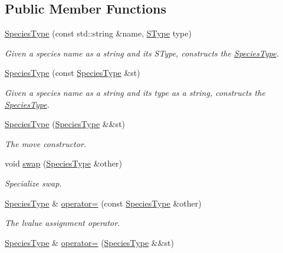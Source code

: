 \subsection*{Public Member Functions}
\begin{DoxyCompactItemize}
\item 
\hyperlink{classchem_1_1SpeciesType_aba027be970f9815e8c5b06e8e6b35d56}{Species\-Type} (const std\-::string \&name, \hyperlink{namespacechem_ad1edc1332f82ed64dd8a810596e781da}{S\-Type} type)
\begin{DoxyCompactList}\small\item\em Given a species name as a string and its S\-Type, constructs the \hyperlink{classchem_1_1SpeciesType}{Species\-Type}. \end{DoxyCompactList}\item 
\hyperlink{classchem_1_1SpeciesType_a265e6d109abe6c02301cb6c4fbd65f04}{Species\-Type} (const \hyperlink{classchem_1_1SpeciesType}{Species\-Type} \&st)
\begin{DoxyCompactList}\small\item\em Given a species name as a string and its type as a string, constructs the \hyperlink{classchem_1_1SpeciesType}{Species\-Type}. \end{DoxyCompactList}\item 
\hyperlink{classchem_1_1SpeciesType_af3bea9cdbd84f279ee0569dd00f1d40b}{Species\-Type} (\hyperlink{classchem_1_1SpeciesType}{Species\-Type} \&\&st)
\begin{DoxyCompactList}\small\item\em The move constructor. \end{DoxyCompactList}\item 
void \hyperlink{classchem_1_1SpeciesType_a336b4a5d95a260178828b606f24fb3af}{swap} (\hyperlink{classchem_1_1SpeciesType}{Species\-Type} \&other)
\begin{DoxyCompactList}\small\item\em Specialize swap. \end{DoxyCompactList}\item 
\hyperlink{classchem_1_1SpeciesType}{Species\-Type} \& \hyperlink{classchem_1_1SpeciesType_aed5c9478f09649f885eb2f8697fb3ddd}{operator=} (const \hyperlink{classchem_1_1SpeciesType}{Species\-Type} \&other)
\begin{DoxyCompactList}\small\item\em The lvalue assignment operator. \end{DoxyCompactList}\item 
\hyperlink{classchem_1_1SpeciesType}{Species\-Type} \& \hyperlink{classchem_1_1SpeciesType_ac77d29789013b307e672e4ecb534b640}{operator=} (\hyperlink{classchem_1_1SpeciesType}{Species\-Type} \&\&st)

\end{DoxyCompactItemize}
